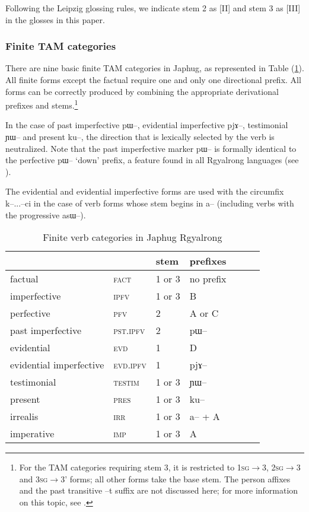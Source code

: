 \documentclass[oldfontcommands,oneside,a4paper,11pt]{article}
\newcommand{\ipa}[1]{{\phon \mbox{#1}}} %
\newcommand{\refb}[1]{(\ref{#1})}
\begin{document}
Following the Leipzig glossing rules, we indicate stem 2 as [II] and stem 3 as [III] in the glosses in this paper.

\subsubsection{Finite TAM categories} \label{sec:finite.TAM}

There are nine basic finite TAM categories in Japhug, as represented in Table \refb{tab:finite.forms}. All finite forms except the factual require one and only one directional prefix. All forms can be correctly produced by combining the appropriate derivational prefixes and stems.\footnote{For the TAM categories requiring stem 3, it is restricted to  \textsc{1sg}$\rightarrow$3, \textsc{2sg}$\rightarrow$3 and \textsc{3sg}$\rightarrow$3' forms; all other forms take the base stem.  The person affixes and the past transitive \ipa{--t} suffix are not discussed here; for  more information on this topic, see \citet{jacques10inverse}.}


In the case of past imperfective \ipa{pɯ--}, evidential imperfective \ipa{pjɤ--}, testimonial \ipa{ɲɯ--} and present \ipa{ku--}, the direction that is lexically selected by the verb is neutralized. Note that the past imperfective marker \ipa{pɯ--} is formally identical to the perfective \ipa{pɯ--} `down' prefix, a feature found in all Rgyalrong languages (see \citealt{lin11direction}).

The evidential and evidential imperfective forms are used with the circumfix \ipa{k--}...\ipa{--ci} in the case of verb forms whose stem begins in \ipa{a--} (including verbs with the progressive \ipa{asɯ--}).

\begin{table}
\caption{Finite verb categories in Japhug Rgyalrong} \label{tab:finite.forms} \centering
\begin{tabular}{lllllll}
\toprule
&	&	stem&	prefixes\\
\midrule
factual&	\textsc{fact} &	1 or 3&	no prefix\\
imperfective&	\textsc{ipfv} &	1 or 3&	B\\
perfective&	\textsc{pfv} &	2&	A or C\\
past imperfective&	\textsc{pst.ipfv} &	2&	\ipa{pɯ--}\\
evidential&	\textsc{evd} &	1&	D\\
evidential imperfective&	\textsc{evd.ipfv} &	1&	\ipa{pjɤ--}\\
testimonial&	\textsc{testim} &	1 or 3&	\ipa{ɲɯ--}\\
present&	\textsc{pres} &	1 or 3&	\ipa{ku--}\\
irrealis&	\textsc{irr} &	1 or 3&	\ipa{a--} + A\\
imperative&	\textsc{imp} &	1 or 3&	A\\
\bottomrule
\end{tabular}
\end{table}
\end{document}
